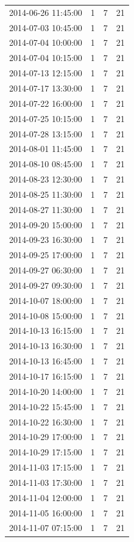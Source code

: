 \begin{tabular}{lrrr}
2014-06-26 11:45:00 & 1 & 7 & 21 \\
2014-07-03 10:45:00 & 1 & 7 & 21 \\
2014-07-04 10:00:00 & 1 & 7 & 21 \\
2014-07-04 10:15:00 & 1 & 7 & 21 \\
2014-07-13 12:15:00 & 1 & 7 & 21 \\
2014-07-17 13:30:00 & 1 & 7 & 21 \\
2014-07-22 16:00:00 & 1 & 7 & 21 \\
2014-07-25 10:15:00 & 1 & 7 & 21 \\
2014-07-28 13:15:00 & 1 & 7 & 21 \\
2014-08-01 11:45:00 & 1 & 7 & 21 \\
2014-08-10 08:45:00 & 1 & 7 & 21 \\
2014-08-23 12:30:00 & 1 & 7 & 21 \\
2014-08-25 11:30:00 & 1 & 7 & 21 \\
2014-08-27 11:30:00 & 1 & 7 & 21 \\
2014-09-20 15:00:00 & 1 & 7 & 21 \\
2014-09-23 16:30:00 & 1 & 7 & 21 \\
2014-09-25 17:00:00 & 1 & 7 & 21 \\
2014-09-27 06:30:00 & 1 & 7 & 21 \\
2014-09-27 09:30:00 & 1 & 7 & 21 \\
2014-10-07 18:00:00 & 1 & 7 & 21 \\
2014-10-08 15:00:00 & 1 & 7 & 21 \\
2014-10-13 16:15:00 & 1 & 7 & 21 \\
2014-10-13 16:30:00 & 1 & 7 & 21 \\
2014-10-13 16:45:00 & 1 & 7 & 21 \\
2014-10-17 16:15:00 & 1 & 7 & 21 \\
2014-10-20 14:00:00 & 1 & 7 & 21 \\
2014-10-22 15:45:00 & 1 & 7 & 21 \\
2014-10-22 16:30:00 & 1 & 7 & 21 \\
2014-10-29 17:00:00 & 1 & 7 & 21 \\
2014-10-29 17:15:00 & 1 & 7 & 21 \\
2014-11-03 17:15:00 & 1 & 7 & 21 \\
2014-11-03 17:30:00 & 1 & 7 & 21 \\
2014-11-04 12:00:00 & 1 & 7 & 21 \\
2014-11-05 16:00:00 & 1 & 7 & 21 \\
2014-11-07 07:15:00 & 1 & 7 & 21 \\

\end{tabular}
